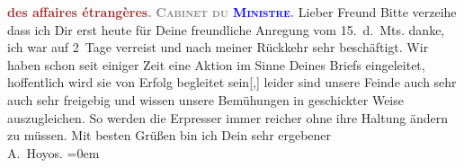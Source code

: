            \pstart
           \textcolor{gray}{\textbf{\textcolor{brown}{des affaires étrangères}{}\ledrightnote{\textcolor{brown}{Ministerium für Äußeres}}.}}\pend
           \pstart
           \textcolor{gray}{\textbf{\textsc{Cabinet du \textcolor{blue}{Ministre}{}.}}}\pend
           \pstart{}Lieber Freund\pend\pstart
           Bitte verzeihe dass ich Dir erst heute für Deine freundliche Anregung vom
                  15. d. Mts. danke, ich war auf 2 Tage verreist und nach meiner
               Rückkehr sehr beschäftigt. Wir haben schon seit einiger Zeit eine Aktion im Sinne
               Deines Briefs {\pb}eingeleitet,
               hoffentlich wird sie von Erfolg begleitet sein{[},{]} leider sind
               unsere Feinde auch sehr auch sehr freigebig und wissen unsere Bemühungen in
               geschickter Weise auszugleichen. So werden die Erpresser immer reicher ohne ihre
               Haltung ändern zu müssen.\pend
           \pstart
           Mit besten Grüßen bin ich {\pb}Dein sehr ergebener {\\[\baselineskip]}\spacefill\mbox{A. Hoyos.}\pend
           \leftskip=0em{}\endnumbering{}  
      